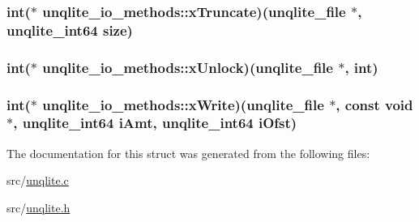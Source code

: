 \hypertarget{structunqlite__io__methods_acbaf05b981262e90bf4bf0abb300bd01}{
\subsubsection[{x\-Truncate}]{\setlength{\rightskip}{0pt plus 5cm}int($\ast$ unqlite\-\_\-io\-\_\-methods\-::x\-Truncate)({\bf unqlite\-\_\-file} $\ast$, {\bf unqlite\-\_\-int64} size)}}\label{d6/d9e/structunqlite__io__methods_acbaf05b981262e90bf4bf0abb300bd01}
\hypertarget{structunqlite__io__methods_addf61dee37aa5018d0f3bdc995dcf13e}{
\subsubsection[{x\-Unlock}]{\setlength{\rightskip}{0pt plus 5cm}int($\ast$ unqlite\-\_\-io\-\_\-methods\-::x\-Unlock)({\bf unqlite\-\_\-file} $\ast$, int)}}\label{d6/d9e/structunqlite__io__methods_addf61dee37aa5018d0f3bdc995dcf13e}
\hypertarget{structunqlite__io__methods_aa96c236a1c4722b48de0926763e89a4e}{
\subsubsection[{x\-Write}]{\setlength{\rightskip}{0pt plus 5cm}int($\ast$ unqlite\-\_\-io\-\_\-methods\-::x\-Write)({\bf unqlite\-\_\-file} $\ast$, const void $\ast$, {\bf unqlite\-\_\-int64} i\-Amt, {\bf unqlite\-\_\-int64} i\-Ofst)}}\label{d6/d9e/structunqlite__io__methods_aa96c236a1c4722b48de0926763e89a4e}


The documentation for this struct was generated from the following files\-:\begin{DoxyCompactItemize}
\item 
src/\hyperlink{unqlite_8c}{unqlite.\-c}\item 
src/\hyperlink{unqlite_8h}{unqlite.\-h}\end{DoxyCompactItemize}
